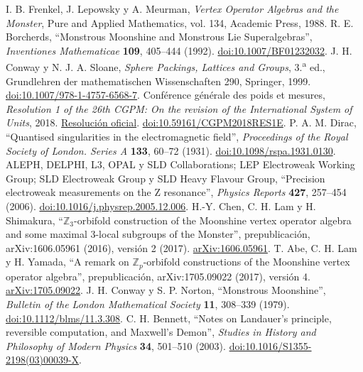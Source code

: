  I. B. Frenkel, J. Lepowsky y A. Meurman, \emph{Vertex Operator Algebras and the Monster}, Pure and Applied Mathematics, vol. 134, Academic Press, 1988.
 R. E. Borcherds, ``Monstrous Moonshine and Monstrous Lie Superalgebras'', \emph{Inventiones Mathematicae} \textbf{109}, 405--444 (1992). \href{https://doi.org/10.1007/BF01232032}{doi:10.1007/BF01232032}.
 J. H. Conway y N. J. A. Sloane, \emph{Sphere Packings, Lattices and Groups}, 3.\textsuperscript{a} ed., Grundlehren der mathematischen Wissenschaften 290, Springer, 1999. \href{https://doi.org/10.1007/978-1-4757-6568-7}{doi:10.1007/978-1-4757-6568-7}.
 Conférence générale des poids et mesures, \emph{Resolution 1 of the 26th CGPM: On the revision of the International System of Units}, 2018. \href{https://www.bipm.org/en/committees/cg/cgpm/26-2018/resolution-1}{Resolución oficial}. \href{https://doi.org/10.59161/CGPM2018RES1E}{doi:10.59161/CGPM2018RES1E}.
 P. A. M. Dirac, ``Quantised singularities in the electromagnetic field'', \emph{Proceedings of the Royal Society of London. Series A} \textbf{133}, 60--72 (1931). \href{https://doi.org/10.1098/rspa.1931.0130}{doi:10.1098/rspa.1931.0130}.
 ALEPH, DELPHI, L3, OPAL y SLD Collaborations; LEP Electroweak Working Group; SLD Electroweak Group y SLD Heavy Flavour Group, ``Precision electroweak measurements on the Z resonance'', \emph{Physics Reports} \textbf{427}, 257--454 (2006). \href{https://doi.org/10.1016/j.physrep.2005.12.006}{doi:10.1016/j.physrep.2005.12.006}.
 H.-Y. Chen, C. H. Lam y H. Shimakura, ``\(\mathbb Z_3\)-orbifold construction of the Moonshine vertex operator algebra and some maximal \(3\)-local subgroups of the Monster'', prepublicación, arXiv:1606.05961 (2016), versión 2 (2017). \href{https://arxiv.org/abs/1606.05961}{arXiv:1606.05961}.
 T. Abe, C. H. Lam y H. Yamada, ``A remark on \(\mathbb Z_p\)-orbifold constructions of the Moonshine vertex operator algebra'', prepublicación, arXiv:1705.09022 (2017), versión 4. \href{https://arxiv.org/abs/1705.09022v4}{arXiv:1705.09022}.
 J. H. Conway y S. P. Norton, ``Monstrous Moonshine'', \emph{Bulletin of the London Mathematical Society} \textbf{11}, 308--339 (1979). \href{https://doi.org/10.1112/blms/11.3.308}{doi:10.1112/blms/11.3.308}.
 C. H. Bennett, ``Notes on Landauer's principle, reversible computation, and Maxwell's Demon'', \emph{Studies in History and Philosophy of Modern Physics} \textbf{34}, 501--510 (2003). \href{https://doi.org/10.1016/S1355-2198(03)00039-X}{doi:10.1016/S1355-2198(03)00039-X}.
